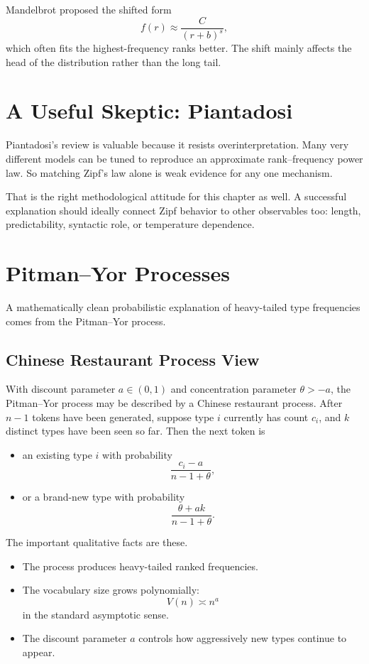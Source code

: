 Mandelbrot proposed the shifted form
\[
  f(r) \approx \frac{C}{(r+b)^s},
\]
which often fits the highest-frequency ranks better. The shift mainly affects the head of the distribution rather than the long tail.

\section{A Useful Skeptic: Piantadosi}

Piantadosi's review \cite{Piantadosi2014} is valuable because it resists overinterpretation. Many very different models can be tuned to reproduce an approximate rank--frequency power law. So matching Zipf's law alone is weak evidence for any one mechanism.

That is the right methodological attitude for this chapter as well. A successful explanation should ideally connect Zipf behavior to other observables too: length, predictability, syntactic role, or temperature dependence.

\section{Pitman--Yor Processes}

A mathematically clean probabilistic explanation of heavy-tailed type frequencies comes from the Pitman--Yor process.

\subsection{Chinese Restaurant Process View}

With discount parameter $a \in (0,1)$ and concentration parameter $\theta > -a$, the Pitman--Yor process may be described by a Chinese restaurant process. After $n-1$ tokens have been generated, suppose type $i$ currently has count $c_i$, and $k$ distinct types have been seen so far. Then the next token is
\begin{itemize}
  \item an existing type $i$ with probability
  \[
    \frac{c_i-a}{n-1+\theta},
  \]
  \item or a brand-new type with probability
  \[
    \frac{\theta + ak}{n-1+\theta}.
  \]
\end{itemize}

The important qualitative facts are these.
\begin{itemize}
  \item The process produces heavy-tailed ranked frequencies.
  \item The vocabulary size grows polynomially:
  \[
    V(n) \asymp n^a
  \]
  in the standard asymptotic sense.
  \item The discount parameter $a$ controls how aggressively new types continue to appear.
\end{itemize}

